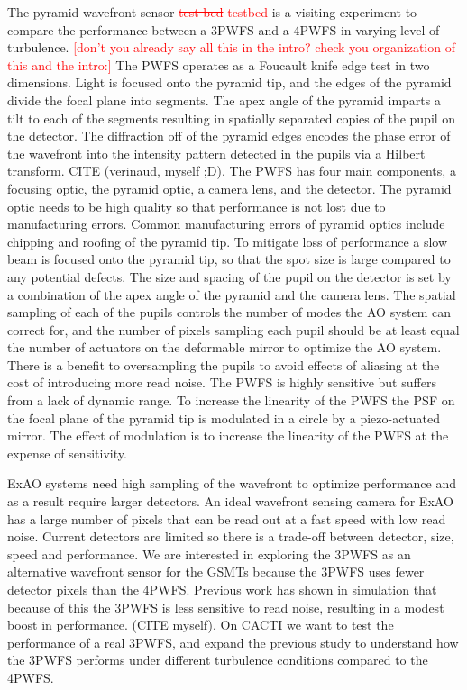\documentclass[12pt]{spieman}  %
\newcommand{\jrmadd}[1]{\textcolor{red}{#1}}
\newcommand{\jrmrmv}[1]{\textcolor{red}{\sout{#1}}}
\newcommand{\jrmcom}[1]{\textcolor{red}{[#1]}}
\begin{document}
\begin{spacing}{2}
The pyramid wavefront sensor \jrmrmv{test-bed} \jrmadd{testbed} is a visiting experiment to compare the performance between a 3PWFS and a 4PWFS in varying level of turbulence. \jrmcom{don't you already say all this in the intro? check you organization of this and the intro:} The PWFS operates as a Foucault knife edge test in two dimensions. Light is focused onto the pyramid tip, and the edges of the pyramid divide the focal plane into segments. The apex angle of the pyramid imparts a tilt to each of the segments resulting in spatially separated copies of the pupil on the detector. The diffraction off of the pyramid edges encodes the phase error of the wavefront into the intensity pattern detected in the pupils via a Hilbert transform. CITE (verinaud, myself ;D). The PWFS has four main components, a focusing optic, the pyramid optic, a camera lens, and the detector. The pyramid optic needs to be high quality so that performance is not lost due to manufacturing errors. Common manufacturing errors of pyramid optics include chipping and roofing of the pyramid tip. To mitigate loss of performance a slow beam is focused onto the pyramid tip, so that the spot size is large compared to any potential defects. The size and spacing of the pupil on the detector is set by a combination of the apex angle of the pyramid and the camera lens. The spatial sampling of each of the pupils controls the number of modes the AO system can correct for, and the number of pixels sampling each pupil should be at least equal the number of actuators on the deformable mirror to optimize the AO system. There is a benefit to oversampling the pupils to avoid effects of aliasing at the cost of introducing more read noise. The PWFS is highly sensitive but suffers from a lack of dynamic range. To increase the linearity of the PWFS the PSF on the focal plane of the pyramid tip is modulated in a circle by a piezo-actuated mirror. The effect of modulation is to increase the linearity of the PWFS at the expense of sensitivity. 

ExAO systems need high sampling of the wavefront to optimize performance and as a result require larger detectors. An ideal wavefront sensing camera for ExAO has a large number of pixels that can be read out at a fast speed with low read noise. Current detectors are limited so there is a trade-off between detector, size, speed and performance. We are interested in exploring the 3PWFS as an alternative wavefront sensor for the GSMTs because the 3PWFS uses fewer detector pixels than the 4PWFS. Previous work has shown in simulation that because of this the 3PWFS is less sensitive to read noise, resulting in a modest boost in performance. (CITE myself). On CACTI we want to test the performance of a real 3PWFS, and expand the previous study to understand how the 3PWFS performs under different turbulence conditions compared to the 4PWFS. 


\end{spacing}
\end{document}
